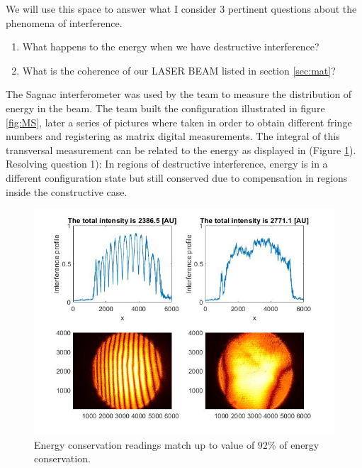 We will use this space to answer what I consider 3 pertinent questions about the phenomena of interference. 
\begin{enumerate}
    \item What happens to the energy when we have destructive interference?
    \item What is the coherence of our LASER BEAM listed in section \ref{sec:mat}? 
\end{enumerate}

The Sagnac interferometer was used by the team to measure the distribution of energy in the beam. The team built the configuration illustrated in figure \ref{fig:MS}, later a series of pictures where taken in order to obtain different fringe numbers and registering as matrix digital measurements. The integral of this transversal measurement can be related to the energy as displayed in (Figure \ref{fig:SagResult}). Resolving question 1): In regions of destructive interference, energy is in a different configuration state but still conserved due to compensation in regions inside the constructive case.
\begin{figure}[H]
    \centering
    \includegraphics[scale=0.25]{Figures/Figures_I/SagnacResult_EnergyConservation.jpg}
    \caption{Energy conservation readings match up to value of $92\%$ of energy conservation. }
    \label{fig:SagResult}
\end{figure}


